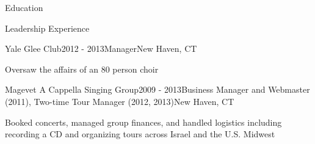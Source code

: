 \documentclass{resume} %
\begin{document}
\begin{rSection}{Education}


\end{rSection}



\begin{rSection}{Leadership Experience}

\begin{rSmallsection}{Yale Glee Club}{2012 - 2013}{Manager}{New Haven, CT}
\item Oversaw the affairs of an 80 person choir
\end{rSmallsection}


\begin{rSubsection}{Magevet A Cappella Singing Group}{2009 - 2013}{Business Manager and Webmaster (2011), Two-time Tour Manager (2012, 2013)}{New Haven, CT}
\item Booked concerts, managed group finances, and handled logistics including recording a CD and organizing tours across Israel and the U.S. Midwest
\end{rSubsection}

\end{rSection}
\end{document}
